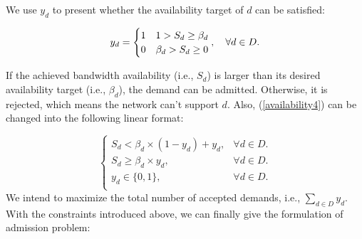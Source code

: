 \documentclass[sigconf]{acmart}
\begin{document}
\begin{appendices}
We use $y_d$ to present whether the availability target of $d$ can be satisfied: 

\begin{equation}
 y_d=
\begin{cases}
1 &\text{$1 >S_d \ge \beta_{d}$}\\
0 &\text{$ \beta_{d} >S_d\ge 0 $}
\end{cases},
\ \ \ \forall  d \in D.
\label{availability4}
\end{equation}

If the achieved bandwidth  availability (i.e., $S_d$) is larger than its desired availability target (i.e., $\beta_d$), the demand can be admitted.
Otherwise, it is rejected, which means the network can't support $d$.
Also,  (\ref{availability4}) can be changed into the following linear format:

\begin{equation}
\begin{cases}
S_d <  \beta_{d}\times  (1-y_d)+y_d,& \forall d \in D. \\
S_d \ge  \beta_{d} \times y_d,& \forall d \in D. \\
y_d\in\{0,1\},& \forall d \in D. \\
\end{cases}
\label{g-2}
\end{equation}
We intend to maximize the total number of accepted demands, i.e., $ \sum_{d\in D} y_d$.
With the constraints introduced above, we can finally give the formulation of admission problem:


\end{appendices}
\end{document}
